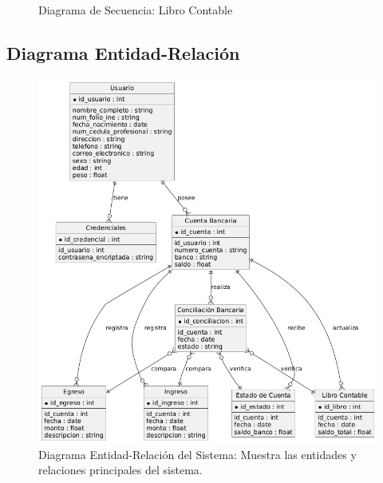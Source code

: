 \documentclass{article}
\begin{document}
\begin{figure}[H]
    \centering
    \caption{Diagrama de Secuencia: Libro Contable}
\end{figure}

\subsection{Diagrama Entidad-Relación}
\begin{figure}[H]
    \centering
    \includegraphics[width=\textwidth]{casos/EntidadRelacion.png}
    \caption{Diagrama Entidad-Relación del Sistema: Muestra las entidades y relaciones principales del sistema.}
\end{figure}
\end{document}
